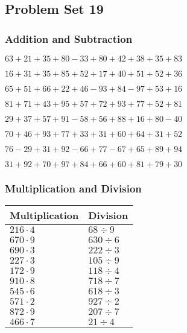 \hypertarget{problem-set-19}{%
\subsection{Problem Set 19}\label{problem-set-19}}

\hypertarget{addition-and-subtraction}{%
\subsubsection{Addition and
Subtraction}\label{addition-and-subtraction}}

\(63+21+35+80-33+80+42+38+35+83\)

\(16+31+35+85+52+17+40+51+52+36\)

\(65+51+66+22+46-93+84-97+53+16\)

\(81+71+43+95+57+72+93+77+52+81\)

\(29+37+57+91-58+56+88+16+80-40\)

\(70+46+93+77+33+31+60+64+31+52\)

\(76-29+31+92-66+77-67+65+89+94\)

\(31+92+70+97+84+66+60+81+79+30\)

\hypertarget{multiplication-and-division}{%
\subsubsection{Multiplication and
Division}\label{multiplication-and-division}}

\begin{longtable}[]{@{}ll@{}}
\toprule
Multiplication & Division\tabularnewline
\midrule
\endhead
\(216\cdot4\) & \(68÷9\)\tabularnewline
\(670\cdot9\) & \(630÷6\)\tabularnewline
\(690\cdot3\) & \(222÷3\)\tabularnewline
\(227\cdot3\) & \(105÷9\)\tabularnewline
\(172\cdot9\) & \(118÷4\)\tabularnewline
\(910\cdot8\) & \(718÷7\)\tabularnewline
\(545\cdot6\) & \(618÷3\)\tabularnewline
\(571\cdot2\) & \(927÷2\)\tabularnewline
\(872\cdot9\) & \(207÷7\)\tabularnewline
\(466\cdot7\) & \(21÷4\)\tabularnewline
\bottomrule
\end{longtable}
